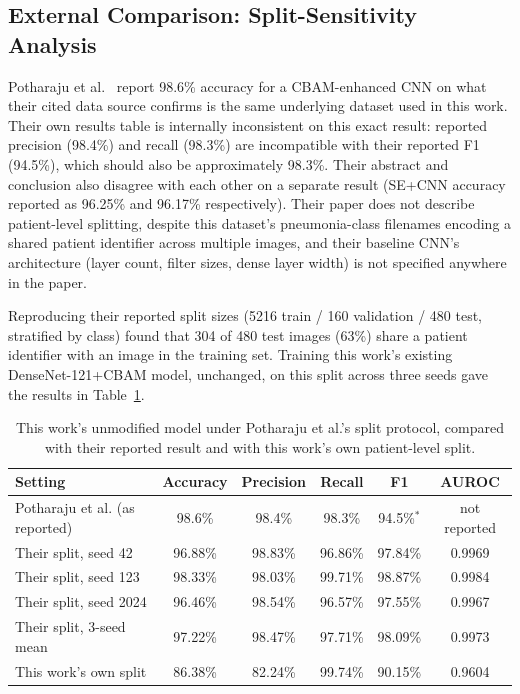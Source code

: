 \subsection{External Comparison: Split-Sensitivity Analysis}
\label{sec:potharaju}

Potharaju et al.~\cite{potharaju2025enhanced} report 98.6\% accuracy for a CBAM-enhanced CNN on what their cited data source confirms is the same underlying dataset used in this work. Their own results table is internally inconsistent on this exact result: reported precision (98.4\%) and recall (98.3\%) are incompatible with their reported F1 (94.5\%), which should also be approximately 98.3\%. Their abstract and conclusion also disagree with each other on a separate result (SE+CNN accuracy reported as 96.25\% and 96.17\% respectively). Their paper does not describe patient-level splitting, despite this dataset's pneumonia-class filenames encoding a shared patient identifier across multiple images, and their baseline CNN's architecture (layer count, filter sizes, dense layer width) is not specified anywhere in the paper.

Reproducing their reported split sizes (5216 train / 160 validation / 480 test, stratified by class) found that 304 of 480 test images (63\%) share a patient identifier with an image in the training set. Training this work's existing DenseNet-121+CBAM model, unchanged, on this split across three seeds gave the results in Table~\ref{tab:potharaju}.

\begin{table}[htbp]
\centering
\caption{This work's unmodified model under Potharaju et al.'s split protocol, compared with their reported result and with this work's own patient-level split.}
\label{tab:potharaju}
\small
\begin{tabular}{lccccc}
\toprule
Setting & Accuracy & Precision & Recall & F1 & AUROC \\
\midrule
Potharaju et al. (as reported) & 98.6\% & 98.4\% & 98.3\% & 94.5\%$^*$ & not reported \\
Their split, seed 42 & 96.88\% & 98.83\% & 96.86\% & 97.84\% & 0.9969 \\
Their split, seed 123 & 98.33\% & 98.03\% & 99.71\% & 98.87\% & 0.9984 \\
Their split, seed 2024 & 96.46\% & 98.54\% & 96.57\% & 97.55\% & 0.9967 \\
Their split, 3-seed mean & 97.22\% & 98.47\% & 97.71\% & 98.09\% & 0.9973 \\
This work's own split & 86.38\% & 82.24\% & 99.74\% & 90.15\% & 0.9604 \\
\bottomrule
\end{tabular}
\end{table}

